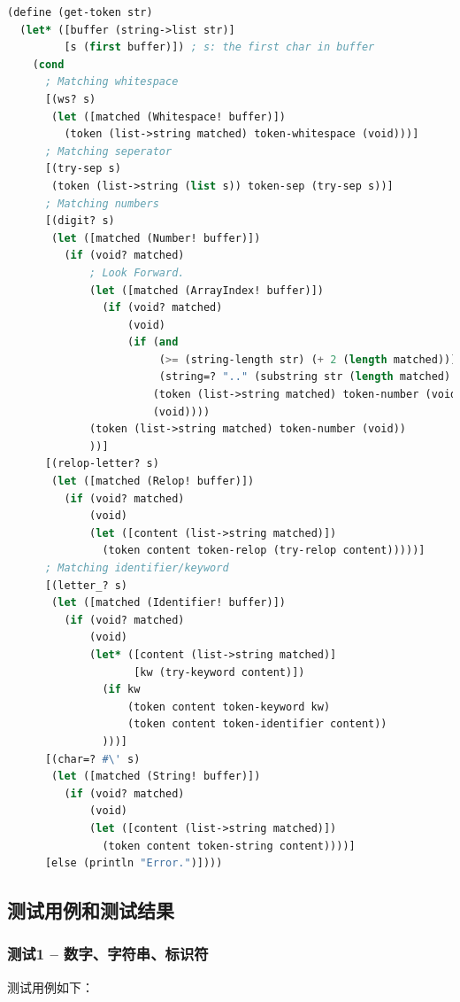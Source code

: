 \documentclass[lang=cn]{elegantpaper}
\begin{document}
\begin{lstlisting}[language=lisp]
(define (get-token str)
  (let* ([buffer (string->list str)]
         [s (first buffer)]) ; s: the first char in buffer
    (cond
      ; Matching whitespace
      [(ws? s)
       (let ([matched (Whitespace! buffer)])
         (token (list->string matched) token-whitespace (void)))]
      ; Matching seperator
      [(try-sep s)
       (token (list->string (list s)) token-sep (try-sep s))]
      ; Matching numbers
      [(digit? s)
       (let ([matched (Number! buffer)])
         (if (void? matched)
             ; Look Forward.
             (let ([matched (ArrayIndex! buffer)])
               (if (void? matched)
                   (void)
                   (if (and
                        (>= (string-length str) (+ 2 (length matched)))
                        (string=? ".." (substring str (length matched) (+ 2 (length matched)))))
                       (token (list->string matched) token-number (void))
                       (void))))
             (token (list->string matched) token-number (void))
             ))]
      [(relop-letter? s)
       (let ([matched (Relop! buffer)])
         (if (void? matched)
             (void)
             (let ([content (list->string matched)])
               (token content token-relop (try-relop content)))))]
      ; Matching identifier/keyword
      [(letter_? s)
       (let ([matched (Identifier! buffer)])
         (if (void? matched)
             (void)
             (let* ([content (list->string matched)]
                    [kw (try-keyword content)])
               (if kw
                   (token content token-keyword kw)
                   (token content token-identifier content))
               )))]
      [(char=? #\' s)
       (let ([matched (String! buffer)])
         (if (void? matched)
             (void)
             (let ([content (list->string matched)])
               (token content token-string content))))]
      [else (println "Error.")])))
\end{lstlisting}

\subsection{测试用例和测试结果}

\subsubsection{测试1 -- 数字、字符串、标识符}

测试用例如下：
\end{document}
